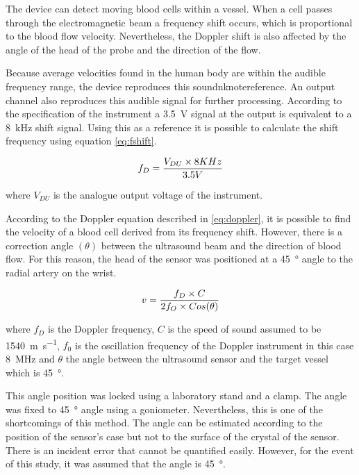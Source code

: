 The device can detect moving blood cells within a vessel.  When a cell passes through the electromagnetic beam a frequency shift occurs, which is proportional to the blood flow velocity. Nevertheless, the Doppler shift is also affected by the angle of the head of the probe and the direction of the flow.

Because average velocities found in the human body are within the audible frequency range, the device reproduces this soundnknote{reference}. An output channel also reproduces this audible signal for further processing. According to the specification of the instrument a \SI{3.5}{\volt} signal at the output is equivalent to a \SI{8}{\kilo\hertz} shift signal. Using this as a reference it is possible to calculate the shift frequency using equation \ref{eq:fshift}.

\begin{align}
	\label{eq:fshift}
	f_D = \frac{V_{DU} \times 8 KHz}{3.5V} \tagaddtext{[\si{\hertz}]}
\end{align}  

where $V_{DU}$ is the analogue output voltage of the instrument. 

According to the Doppler equation described in \ref{eq:doppler}, it is possible to find the velocity of a blood cell derived from its frequency shift. However, there is a correction angle $(\theta)$ between the ultrasound beam and the direction of blood flow. For this reason, the head of the sensor was positioned at a \SI{45}{\degree} angle to the radial artery on the wrist.

\begin{align}
	\label{eq:doppler}
	v = \frac{f_D \times C}{2 f_O \times Cos(\theta)} \tagaddtext{[\si{\meter\per\second}]}
\end{align}

where $f_D$ is the Doppler frequency, $C$ is the speed of sound assumed to be \SI{1540}{\meter\per\second}, $f_0$ is the oscillation frequency of the Doppler instrument in this case \SI{8}{\mega\hertz} and $\theta$ the angle between the ultrasound sensor and the target vessel which is \SI{45}{\degree}.

This angle position was locked using a laboratory stand and a clamp. The angle was fixed to \SI{45}{\degree} angle using a goniometer. Nevertheless, this is one of the shortcomings of this method. The angle can be estimated according to the position of the sensor's case but not to the surface of the crystal of the sensor. There is an incident error that cannot be quantified easily. However, for the event of this study, it was assumed that the angle is \SI{45}{\degree}.

